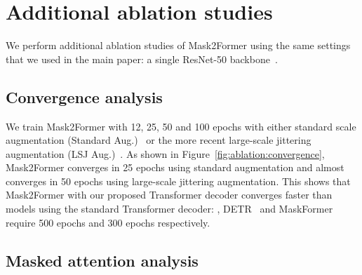 \documentclass[10pt,twocolumn,letterpaper]{article}
\newcommand{\modelname}{Mask2Former\xspace}
\newcommand{\figref}[1]{Figure~\ref{#1}}
\begin{document}
\section{Additional ablation studies}
\label{app:abl}
We perform additional ablation studies of \modelname using the same settings that we used in the main paper: a single ResNet-50 backbone~\cite{he2016deep}.

\subsection{Convergence analysis}
We train \modelname  with 12, 25, 50 and 100 epochs with either standard scale augmentation (Standard Aug.)~\cite{wu2019detectron2} or the more recent large-scale jittering augmentation (LSJ Aug.)~\cite{ghiasi2021simple,du2021simple}. As shown in \figref{fig:ablation:convergence}, \modelname converges in 25 epochs using standard augmentation and almost converges in 50 epochs using large-scale jittering augmentation. This shows that \modelname with our proposed Transformer decoder converges faster than models using the standard Transformer decoder: \eg, DETR~\cite{detr} and MaskFormer~\cite{cheng2021maskformer} require 500 epochs and 300 epochs respectively.

\subsection{Masked attention analysis}
\end{document}
